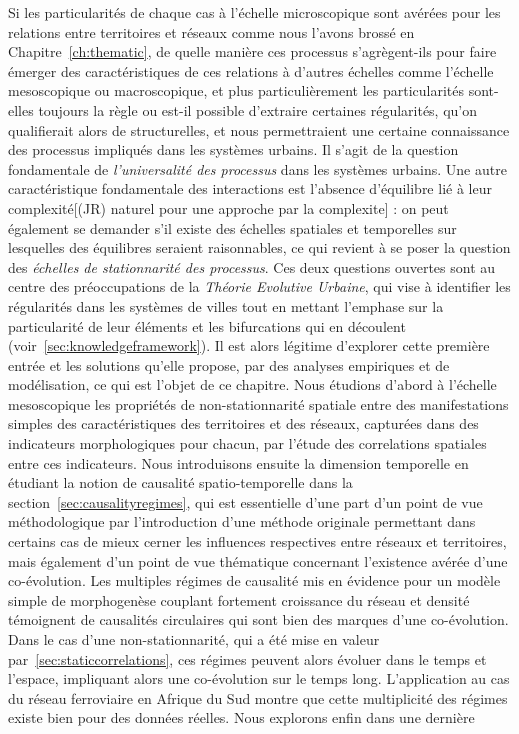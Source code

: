 Si les particularités de chaque cas à l'échelle microscopique sont avérées pour les relations entre territoires et réseaux comme nous l'avons brossé en Chapitre~\ref{ch:thematic}, de quelle manière ces processus s'agrègent-ils pour faire émerger des caractéristiques de ces relations à d'autres échelles comme l'échelle mesoscopique ou macroscopique, et plus particulièrement les particularités sont-elles toujours la règle ou est-il possible d'extraire certaines régularités, qu'on qualifierait alors de structurelles, et nous permettraient une certaine connaissance des processus impliqués dans les systèmes urbains. Il s'agit de la question fondamentale de \emph{l'universalité des processus} dans les systèmes urbains. Une autre caractéristique fondamentale des interactions est l'absence d'équilibre lié à leur complexité[(JR) naturel pour une approche par la complexite] : on peut également se demander s'il existe des échelles spatiales et temporelles sur lesquelles des équilibres seraient raisonnables, ce qui revient à se poser la question des \emph{échelles de stationnarité des processus}. Ces deux questions ouvertes sont au centre des préoccupations de la \emph{Théorie Evolutive Urbaine}, qui vise à identifier les régularités dans les systèmes de villes tout en mettant l'emphase sur la particularité de leur éléments et les bifurcations qui en découlent (voir~\ref{sec:knowledgeframework}). Il est alors légitime d'explorer cette première entrée et les solutions qu'elle propose, par des analyses empiriques et de modélisation, ce qui est l'objet de ce chapitre. Nous étudions d'abord à l'échelle mesoscopique les propriétés de non-stationnarité spatiale entre des manifestations simples des caractéristiques des territoires et des réseaux, capturées dans des indicateurs morphologiques pour chacun, par l'étude des correlations spatiales entre ces indicateurs. Nous introduisons ensuite la dimension temporelle en étudiant la notion de causalité spatio-temporelle dans la section~\ref{sec:causalityregimes}, qui est essentielle d'une part d'un point de vue méthodologique par l'introduction d'une méthode originale permettant dans certains cas de mieux cerner les influences respectives entre réseaux et territoires, mais également d'un point de vue thématique concernant l'existence avérée d'une co-évolution. Les multiples régimes de causalité mis en évidence pour un modèle simple de morphogenèse couplant fortement croissance du réseau et densité témoignent de causalités circulaires qui sont bien des marques d'une co-évolution. Dans le cas d'une non-stationnarité, qui a été mise en valeur par~\ref{sec:staticcorrelations}, ces régimes peuvent alors évoluer dans le temps et l'espace, impliquant alors une co-évolution sur le temps long. L'application au cas du réseau ferroviaire en Afrique du Sud montre que cette multiplicité des régimes existe bien pour des données réelles. Nous explorons enfin dans une dernière 